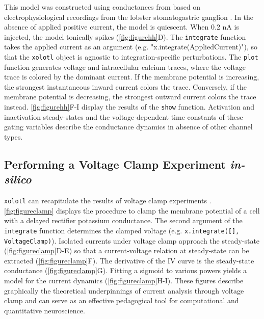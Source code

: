 \documentclass{frontiersSCNS} %
\begin{document}
This model was constructed using conductances from \cite{liuModelNeuronActivitydependent1998} based on electrophysiological recordings from the lobster stomatogastric ganglion \autocite{turrigianoSelectiveRegulationCurrent1995}. In the absence of applied positive current, the model is quiescent. When 0.2 nA is injected, the model tonically spikes (\ref{fig:figurehh}D). The \texttt{integrate} function takes the applied current as an argument (e.g. "x.integrate(AppliedCurrent)"), so that the \texttt{xolotl} object is agnostic to integration-specific perturbations. The \texttt{plot} function generates voltage and intracellular calcium traces, where the voltage trace is colored by the dominant current. If the membrane potential is increasing, the strongest instantaneous inward current colors the trace. Conversely, if the membrane potential is decreasing, the strongest outward current colors the trace instead. \ref{fig:figurehh}F-I display the results of the \texttt{show} function. Activation and inactivation steady-states and the voltage-dependent time constants of these gating variables describe the conductance dynamics in absence of other channel types.

%
%
%
%
%
%

\subsection{Performing a Voltage Clamp Experiment \textit{in-silico}}

\texttt{xolotl} can recapitulate the results of voltage clamp experiments \autocite{turrigianoSelectiveRegulationCurrent1995, swensenMultiplePeptidesConverge2000, swensenModulatorsConvergentCellular2001, destexheDynamicClampPrinciplesApplications2009}. \ref{fig:figureclamp} displays the procedure to clamp the membrane potential of a cell with a delayed rectifier potassium conductance. The second argument of the \texttt{integrate} function determines the clamped voltage (e.g. \texttt{x.integrate([], VoltageClamp)}). Isolated currents under voltage clamp approach the steady-state (\ref{fig:figureclamp}D-E) so that a current-voltage relation at steady-state can be extracted (\ref{fig:figureclamp}F). The derivative of the IV curve is the steady-state conductance (\ref{fig:figureclamp}G). Fitting a sigmoid to various powers yields a model for the current dynamics (\ref{fig:figureclamp}H-I). These figures describe graphically the theoretical underpinnings of current analysis through voltage clamp and can serve as an effective pedagogical tool for computational and quantitative neuroscience.
\end{document}
